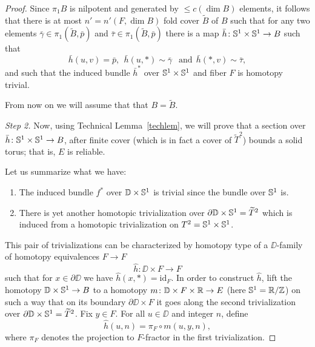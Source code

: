 \documentclass{amsart}
\begin{document}
\begin{proof}
Since $\pi_1 B$ is nilpotent and generated by $\le c(\dim B)$ elements,
it follows that there is  at most $n'=n'(F,\dim B)$ fold  cover $\widetilde B$ of $B$ such that for any two elements $\bar\gamma\in \pi_1(\tilde B,\bar p)$ and $\bar\tau\in \pi_1(\tilde B,\bar p)$ there is a map 
$\bar h\colon {\Bbb S}^1\times {\Bbb S}^1\to B$ such that 
$$\bar h(u,v)=\bar p,\ \ 
\bar h(u,*)\sim\bar\gamma\ \ \text{ and}\ \ 
\bar h(*,v)\sim\bar\tau,$$
and such that the induced bundle $\bar h^*$ over ${\Bbb S}^1\times {\Bbb S}^1$ and fiber $F$ is homotopy trivial.

\medskip

From now on we will assume that that $B=\tilde B$.

\medskip

\noindent\textit{Step 2.} 
Now, using Technical Lemma~\ref{techlem}, 
we will prove that a section over 
$\bar h\colon {\Bbb S}^1\times {\Bbb S}^1\to B$, after finite cover (which is in fact a cover of $\tilde T^2$) bounds a solid torus;
that is, $ E$ is reliable. 

Let us summarize what we have:

\begin{enumerate}
\item The  induced bundle $f^*$ over $\mathbb{D}\times {\Bbb S}^1$ is trivial since the bundle over ${\Bbb S}^1$ is. 
\item There is yet another homotopic trivialization over $\partial \mathbb{D}\times {\Bbb S}^1=\widetilde T^2$ which is induced from a homotopic trivialization on $T^2={\Bbb S}^1\times {\Bbb S}^1$.
\end{enumerate}



This pair of trivializations can be characterized by homotopy type of a
$\DD$-family of homotopy equivalences $F\to F$
\[\hat h\colon \DD\times F\to F\]
such that for 
$x\in\partial \DD$ we have $\hat h(x,*)=\mathrm{id}_F$.
In order to construct $\hat h$, 
lift the homotopy $\mathbb{D}\times {\Bbb S}^1\to B$ to a homotopy 
$m\colon \mathbb{D}\times F\times {\Bbb R}\to E$ 
(here ${\Bbb S}^1={\Bbb R}/{\Bbb Z}$) on such a way that on its boundary $\partial \DD\times F$ it goes along the second trivialization over $\partial \mathbb{D}\times {\Bbb S}^1=\widetilde T^2$.
Fix $y\in F$. 
For all $u\in \DD$ and integer $n$, define 
\[\hat h(u,n)=\pi_F\circ m(u,y,n),\] 
where $\pi_F$ denotes the projection to $F$-fractor in the first trivialization.


\end{proof}
\end{document}
